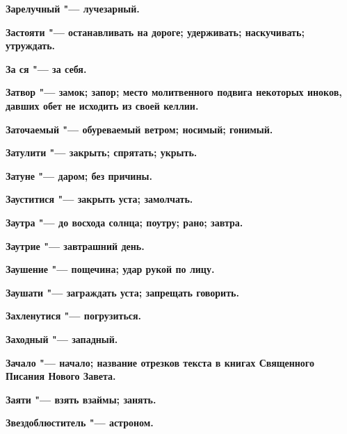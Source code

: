 \bfseries Зарелучный \normalfont{} "--- лучезарный. 




\bfseries Застояти \normalfont{} "--- останавливать на дороге; удерживать; наскучивать; утруждать. 




\bfseries За ся \normalfont{} "--- за себя. 




\bfseries Затвор \normalfont{} "--- замок; запор; место молитвенного подвига некоторых иноков, давших обет не исходить из своей келлии. 




\bfseries Заточаемый \normalfont{} "--- обуреваемый ветром; носимый; гонимый. 




\bfseries Затулити \normalfont{} "--- закрыть; спрятать; укрыть. 




\bfseries Затуне \normalfont{} "--- даром; без причины. 




\bfseries Зауститися \normalfont{} "--- закрыть уста; замолчать. 




\bfseries Заутра \normalfont{} "--- до восхода солнца; поутру; рано; завтра. 




\bfseries Заутрие \normalfont{} "--- завтрашний день. 




\bfseries Заушение \normalfont{} "--- пощечина; удар рукой по лицу. 




\bfseries Заушати \normalfont{} "--- заграждать уста; запрещать говорить. 




\bfseries Захленутися \normalfont{} "--- погрузиться. 




\bfseries Заходный \normalfont{} "--- западный. 




\bfseries Зачало \normalfont{} "--- начало; название отрезков текста в книгах Священного Писания Нового Завета. 




\bfseries Заяти \normalfont{} "--- взять взаймы; занять. 




\bfseries Звездоблюститель \normalfont{} "--- астроном. 




